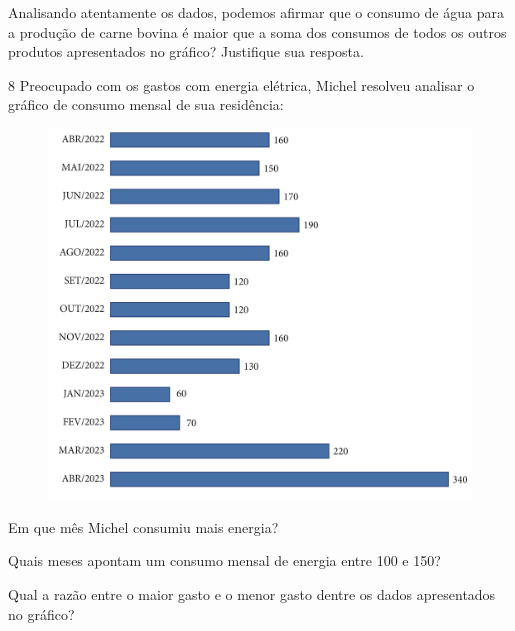 Analisando atentamente os dados, podemos afirmar que o consumo de água
para a produção de carne bovina é maior que a soma dos consumos de todos
os outros produtos apresentados no gráfico? Justifique sua resposta.




\pagebreak
\num{8} Preocupado com os gastos com energia elétrica, Michel resolveu
analisar o gráfico de consumo mensal de sua residência:

\begin{figure}[htpb!]
\includegraphics[width=\textwidth]{../ilustracoes/MAT5/SAEB_5ANO_MAT_figura107.png}
\end{figure}

\begin{escolha}
\item
  Em que mês Michel consumiu mais energia?
\item{}

\item
  Quais meses apontam um consumo mensal de energia entre 100 e 150?
\item{}

\item
  Qual a razão entre o maior gasto e o menor gasto dentre os dados
  apresentados no gráfico?

\item {}
\end{escolha}


